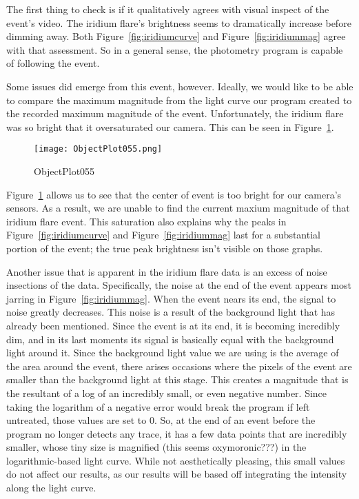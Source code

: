 The first thing to check is if it qualitatively agrees with visual inspect of the event's video. The iridium flare's brightness seems to dramatically increase before dimming away. Both Figure~\ref{fig:iridiumcurve} and Figure~\ref{fig:iridiummag} agree with that assessment. So in a general sense, the photometry program is capable of following the event.

Some issues did emerge from this event, however. Ideally, we would like to be able to compare the maximum magnitude from the light curve our program created to the recorded maximum magnitude of the event. Unfortunately, the iridium flare was so bright that it oversaturated our camera. This can be seen in Figure~\ref{fig:ObjectPlot055}.

\begin{figure}[ht!]
	\centering
	\texttt{[image: ObjectPlot055.png]}
	\caption{ObjectPlot055}
	\label{fig:ObjectPlot055}
\end{figure}

Figure~\ref{fig:ObjectPlot055} allows us to see that the center of event is too bright for our camera's sensors. As a result, we are unable to find the current maxium magnitude of that iridium flare event. This saturation also explains why the peaks in Figure~\ref{fig:iridiumcurve} and Figure~\ref{fig:iridiummag} last for a substantial portion of the event; the true peak brightness isn't visible on those graphs. 

Another issue that is apparent in the iridium flare data is an excess of noise insections of the data. Specifically, the noise at the end of the event appears most jarring in Figure~\ref{fig:iridiummag}. When the event nears its end, the signal to noise greatly decreases. This noise is a result of the background light that has already been mentioned. Since the event is at its end, it is becoming incredibly dim, and in its last moments its signal is basically equal with the background light around it. Since the background light value we are using is the average of the area around the event, there arises occasions where the pixels of the event are smaller than the background light at this stage. This creates a magnitude that is the resultant of a log of an incredibly small, or even negative number. Since taking the logarithm of a negative error would break the program if left untreated, those values are set to 0. So, at the end of an event before the program no longer detects any trace, it has a few data points that are incredibly smaller, whose tiny size is magnified (this seems oxymoronic???) in the logarithmic-based light curve. While not aesthetically pleasing, this small values do not affect our results, as our results will be based off integrating the intensity along the light curve.

